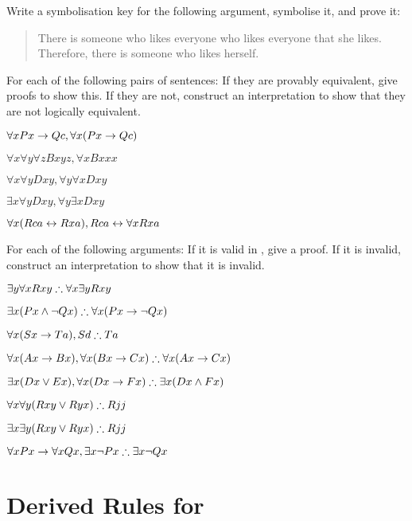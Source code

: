 \solutions
\problempart
\label{pr.likes}
Write a symbolisation key for the following argument, symbolise it, and prove it:
\begin{quote}
There is someone who likes everyone who likes everyone that she likes. Therefore, there is someone who likes herself.
\end{quote}

\solutions
\problempart
\label{pr.FOLequivornot}
For each of the following pairs of sentences: If they are provably equivalent, give proofs to show this. If they are not, construct an interpretation to show that they are not logically equivalent.
\begin{earg}
\item $\forall x Px \rightarrow Qc, \forall x (Px \rightarrow Qc)$
\item $\forall x\forall y \forall z Bxyz, \forall x Bxxx$
\item $\forall x\forall y Dxy, \forall y\forall x Dxy$
\item $\exists x\forall y Dxy, \forall y\exists x Dxy$
\item $\forall x (Rca \leftrightarrow Rxa), Rca \leftrightarrow \forall x Rxa$
\end{earg}

\solutions
\problempart
\label{pr.FOLvalidornot}
For each of the following arguments: If it is valid in \FOL, give a proof. If it is invalid, construct an interpretation to show that it is invalid.
\begin{earg}
\item $\exists y\forall x Rxy \mathrel{\therefore} \forall x\exists y Rxy$
\item $\exists x(Px \wedge \neg Qx) \mathrel{\therefore} \forall x(Px \rightarrow \neg Qx)$
\item $\forall x(Sx \rightarrow Ta), Sd \mathrel{\therefore} Ta$
\item $\forall x(Ax\rightarrow Bx), \forall x(Bx \rightarrow Cx) \mathrel{\therefore} \forall x(Ax \rightarrow Cx)$
\item $\exists x(Dx \vee Ex), \forall x(Dx \rightarrow Fx) \mathrel{\therefore} \exists x(Dx \wedge Fx)$
\item $\forall x\forall y(Rxy \vee Ryx) \mathrel{\therefore} Rjj$
\item $\exists x\exists y(Rxy \vee Ryx) \mathrel{\therefore} Rjj$
\item $\forall x Px \rightarrow \forall x Qx, \exists x \neg Px \mathrel{\therefore} \exists x \neg Qx$
\end{earg}


\chapter{Derived Rules for \textnormal{\FOL}}\label{s:CQ}

